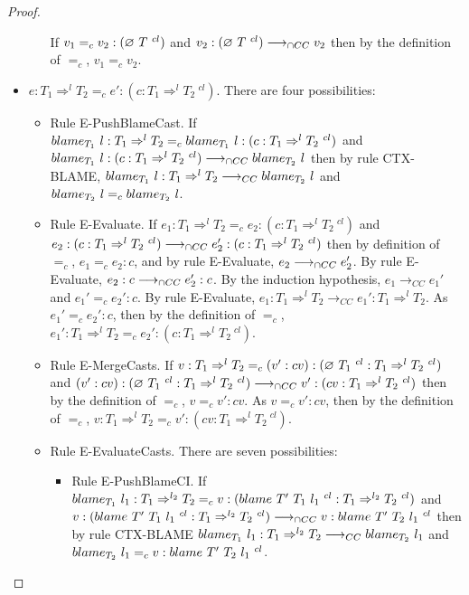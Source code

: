 \documentclass[a4paper]{article}
\begin{document}
\begin{proof}
\begin{itemize}
\begin{itemize}
        If $v_1 =_c v_2 : (\varnothing\ T\ ^{cl})$ and $v_2 : (\varnothing\ T\ ^{cl}) \longrightarrow_{\cap CC} v_2$ then by the definition of $=_c$, $v_1 =_c v_2$.
    \end{itemize}
    \item $e : T_1 \Rightarrow^l T_2 =_c e' : (c : T_1 \Rightarrow^l T_2\ ^{cl})$.
    There are four possibilities:
    \begin{itemize}
        \item Rule E-PushBlameCast.
        If $blame_{T_1}\ l : T_1 \Rightarrow^l T_2 =_c blame_{T_1}\ l : (c : T_1 \Rightarrow^l T_2\ ^{cl})$ and $blame_{T_1}\ l : (c : T_1 \Rightarrow^l T_2\ ^{cl}) \longrightarrow_{\cap CC} blame_{T_2}\ l$ then by rule CTX-BLAME, $blame_{T_1}\ l : T_1 \Rightarrow^l T_2 \longrightarrow_{CC} blame_{T_2}\ l$ and $blame_{T_2}\ l =_c blame_{T_2}\ l$.
        \item Rule E-Evaluate.
        If $e_1 : T_1 \Rightarrow^l T_2 =_c e_2 : (c : T_1 \Rightarrow^l T_2\ ^{cl})$ and $e_2 : (c : T_1 \Rightarrow^l T_2\ ^{cl}) \longrightarrow_{\cap CC} e_2' : (c : T_1 \Rightarrow^l T_2\ ^{cl})$ then by definition of $=_c$, $e_1 =_c e_2 : c$, and by rule E-Evaluate, $e_2 \longrightarrow_{\cap CC} e_2'$.
        By rule E-Evaluate, $e_2 : c \longrightarrow_{\cap CC} e_2' : c$.
        By the induction hypothesis, $e_1 \longrightarrow_{CC} e_1'$ and $e_1' =_c e_2' : c$.
        By rule E-Evaluate, $e_1 : T_1 \Rightarrow^l T_2 \longrightarrow_{CC} e_1' : T_1 \Rightarrow^l T_2$.
        As $e_1' =_c e_2' : c$, then by the definition of $=_c$, $e_1' : T_1 \Rightarrow^l T_2 =_c e_2' : (c : T_1 \Rightarrow^l T_2\ ^{cl})$.
        \item Rule E-MergeCasts.
        If $v : T_1 \Rightarrow^l T_2 =_c (v' : cv ) : (\varnothing\ T_1\ ^{cl} : T_1 \Rightarrow^l T_2\ ^{cl})$ and $(v' : cv ) : (\varnothing\ T_1\ ^{cl} : T_1 \Rightarrow^l T_2\ ^{cl}) \longrightarrow_{\cap CC} v' : (cv : T_1 \Rightarrow^l T_2\ ^{cl})$ then by the definition of $=_c$, $v =_c v' : cv$.
        As $v =_c v' : cv$, then by the definition of $=_c$, $v : T_1 \Rightarrow^l T_2 =_c v' : (cv : T_1 \Rightarrow^l T_2\ ^{cl})$.
        \item Rule E-EvaluateCasts.
        There are seven possibilities:
        \begin{itemize}
            \item Rule E-PushBlameCI.
            If $\blame{T_1}{l_1} : T_1 \Rightarrow^{l_2} T_2 =_c v : (\blamecast{T'}{T_1}{l_1}{cl} : T_1 \Rightarrow^{l_2} T_2\ ^{cl})$ and $v : (blame\ T'\ T_1\ l_1\ ^{cl} : T_1 \Rightarrow^{l_2} T_2\ ^{cl}) \longrightarrow_{\cap CC} v : blame\ T'\ T_2\ l_1\ ^{cl}$ then by rule CTX-BLAME $blame_{T_1}\ l_1 : T_1 \Rightarrow^{l_2} T_2 \longrightarrow_{CC} blame_{T_2}\ l_1$ and $blame_{T_2}\ l_1 =_c v : blame\ T'\ T_2\ l_1\ ^{cl}$.

\end{itemize}
\end{itemize}
\end{itemize}
\end{proof}
\end{document}
